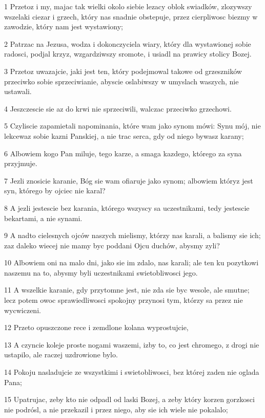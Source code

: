 \par 1 Przetoz i my, majac tak wielki okolo siebie lezacy oblok swiadków, zlozywszy wszelaki ciezar i grzech, który nas snadnie obstepuje, przez cierpliwosc biezmy w zawodzie, który nam jest wystawiony;
\par 2 Patrzac na Jezusa, wodza i dokonczyciela wiary, który dla wystawionej sobie radosci, podjal krzyz, wzgardziwszy sromote, i usiadl na prawicy stolicy Bozej.
\par 3 Przetoz uwazajcie, jaki jest ten, który podejmowal takowe od grzeszników przeciwko sobie sprzeciwianie, abyscie oslabiwszy w umyslach waszych, nie ustawali.
\par 4 Jeszczescie sie az do krwi nie sprzeciwili, walczac przeciwko grzechowi.
\par 5 Czyliscie zapamietali napominania, które wam jako synom mówi: Synu mój, nie lekcewaz sobie kazni Panskiej, a nie trac serca, gdy od niego bywasz karany;
\par 6 Albowiem kogo Pan miluje, tego karze, a smaga kazdego, którego za syna przyjmuje.
\par 7 Jezli znosicie karanie, Bóg sie wam ofiaruje jako synom; albowiem któryz jest syn, którego by ojciec nie karal?
\par 8 A jezli jestescie bez karania, którego wszyscy sa uczestnikami, tedy jestescie bekartami, a nie synami.
\par 9 A nadto cielesnych ojców naszych mielismy, którzy nas karali, a balismy sie ich; zaz daleko wiecej nie mamy byc poddani Ojcu duchów, abysmy zyli?
\par 10 Albowiem oni na malo dni, jako sie im zdalo, nas karali; ale ten ku pozytkowi naszemu na to, abysmy byli uczestnikami swietobliwosci jego.
\par 11 A wszelkie karanie, gdy przytomne jest, nie zda sie byc wesole, ale smutne; lecz potem owoc sprawiedliwosci spokojny przynosi tym, którzy sa przez nie wycwiczeni.
\par 12 Przeto opuszczone rece i zemdlone kolana wyprostujcie,
\par 13 A czyncie koleje proste nogami waszemi, izby to, co jest chromego, z drogi nie ustapilo, ale raczej uzdrowione bylo.
\par 14 Pokoju nasladujcie ze wszystkimi i swietobliwosci, bez której zaden nie oglada Pana;
\par 15 Upatrujac, zeby kto nie odpadl od laski Bozej, a zeby który korzen gorzkosci nie podrósl, a nie przekazil i przez niego, aby sie ich wiele nie pokalalo;
